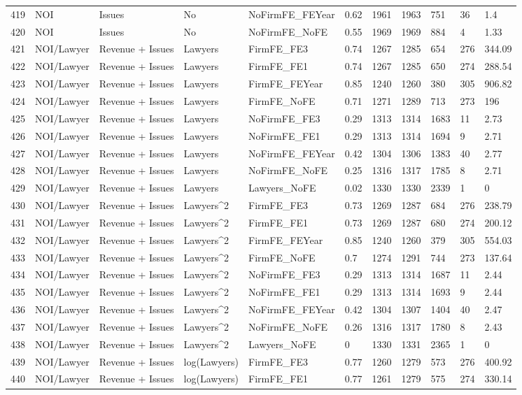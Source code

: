 \documentclass{article}
\begin{document}
\begin{table}[H]
\begin{tabular}{rllllllllll}
  419 & NOI & Issues & No & NoFirmFE\_FEYear & 0.62 & 1961 & 1963 & 751 & 36 & 1.4 \\ 
  420 & NOI & Issues & No & NoFirmFE\_NoFE & 0.55 & 1969 & 1969 & 884 & 4 & 1.33 \\ 
  421 & NOI/Lawyer & Revenue + Issues & Lawyers & FirmFE\_FE3 & 0.74 & 1267 & 1285 & 654 & 276 & 344.09 \\ 
  422 & NOI/Lawyer & Revenue + Issues & Lawyers & FirmFE\_FE1 & 0.74 & 1267 & 1285 & 650 & 274 & 288.54 \\ 
  423 & NOI/Lawyer & Revenue + Issues & Lawyers & FirmFE\_FEYear & 0.85 & 1240 & 1260 & 380 & 305 & 906.82 \\ 
  424 & NOI/Lawyer & Revenue + Issues & Lawyers & FirmFE\_NoFE & 0.71 & 1271 & 1289 & 713 & 273 & 196 \\ 
  425 & NOI/Lawyer & Revenue + Issues & Lawyers & NoFirmFE\_FE3 & 0.29 & 1313 & 1314 & 1683 & 11 & 2.73 \\ 
  426 & NOI/Lawyer & Revenue + Issues & Lawyers & NoFirmFE\_FE1 & 0.29 & 1313 & 1314 & 1694 & 9 & 2.71 \\ 
  427 & NOI/Lawyer & Revenue + Issues & Lawyers & NoFirmFE\_FEYear & 0.42 & 1304 & 1306 & 1383 & 40 & 2.77 \\ 
  428 & NOI/Lawyer & Revenue + Issues & Lawyers & NoFirmFE\_NoFE & 0.25 & 1316 & 1317 & 1785 & 8 & 2.71 \\ 
  429 & NOI/Lawyer & Revenue + Issues & Lawyers & Lawyers\_NoFE & 0.02 & 1330 & 1330 & 2339 & 1 & 0 \\ 
  430 & NOI/Lawyer & Revenue + Issues & Lawyers^2 & FirmFE\_FE3 & 0.73 & 1269 & 1287 & 684 & 276 & 238.79 \\ 
  431 & NOI/Lawyer & Revenue + Issues & Lawyers^2 & FirmFE\_FE1 & 0.73 & 1269 & 1287 & 680 & 274 & 200.12 \\ 
  432 & NOI/Lawyer & Revenue + Issues & Lawyers^2 & FirmFE\_FEYear & 0.85 & 1240 & 1260 & 379 & 305 & 554.03 \\ 
  433 & NOI/Lawyer & Revenue + Issues & Lawyers^2 & FirmFE\_NoFE & 0.7 & 1274 & 1291 & 744 & 273 & 137.64 \\ 
  434 & NOI/Lawyer & Revenue + Issues & Lawyers^2 & NoFirmFE\_FE3 & 0.29 & 1313 & 1314 & 1687 & 11 & 2.44 \\ 
  435 & NOI/Lawyer & Revenue + Issues & Lawyers^2 & NoFirmFE\_FE1 & 0.29 & 1313 & 1314 & 1693 & 9 & 2.44 \\ 
  436 & NOI/Lawyer & Revenue + Issues & Lawyers^2 & NoFirmFE\_FEYear & 0.42 & 1304 & 1307 & 1404 & 40 & 2.47 \\ 
  437 & NOI/Lawyer & Revenue + Issues & Lawyers^2 & NoFirmFE\_NoFE & 0.26 & 1316 & 1317 & 1780 & 8 & 2.43 \\ 
  438 & NOI/Lawyer & Revenue + Issues & Lawyers^2 & Lawyers\_NoFE & 0 & 1330 & 1331 & 2365 & 1 & 0 \\ 
  439 & NOI/Lawyer & Revenue + Issues & log(Lawyers) & FirmFE\_FE3 & 0.77 & 1260 & 1279 & 573 & 276 & 400.92 \\ 
  440 & NOI/Lawyer & Revenue + Issues & log(Lawyers) & FirmFE\_FE1 & 0.77 & 1261 & 1279 & 575 & 274 & 330.14 \\ 
   \hline
\end{tabular}
\end{table}
\end{document}
